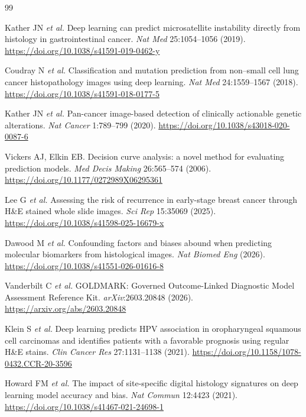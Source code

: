 \documentclass[a4paper,10pt,twocolumn]{extarticle}
\begin{document}
\begingroup
\scriptsize
\begin{thebibliography}{99}
\setlength{\itemsep}{0pt}

Kather JN \textit{et al.} Deep learning can predict microsatellite instability
directly from histology in gastrointestinal cancer.
\textit{Nat Med} 25:1054--1056 (2019).
\url{https://doi.org/10.1038/s41591-019-0462-y}

Coudray N \textit{et al.} Classification and mutation prediction from
non--small cell lung cancer histopathology images using deep learning.
\textit{Nat Med} 24:1559--1567 (2018).
\url{https://doi.org/10.1038/s41591-018-0177-5}

Kather JN \textit{et al.} Pan-cancer image-based detection of clinically
actionable genetic alterations. \textit{Nat Cancer} 1:789--799 (2020).
\url{https://doi.org/10.1038/s43018-020-0087-6}

Vickers AJ, Elkin EB. Decision curve analysis: a novel method for evaluating
prediction models. \textit{Med Decis Making} 26:565--574 (2006).
\url{https://doi.org/10.1177/0272989X06295361}

Lee G \textit{et al.} Assessing the risk of recurrence in early-stage breast
cancer through H\&E stained whole slide images. \textit{Sci Rep} 15:35069
(2025). \url{https://doi.org/10.1038/s41598-025-16679-x}

Dawood M \textit{et al.} Confounding factors and
biases abound when predicting molecular biomarkers from histological images.
\textit{Nat Biomed Eng} (2026).
\url{https://doi.org/10.1038/s41551-026-01616-8}

Vanderbilt C \textit{et al.} GOLDMARK: Governed Outcome-Linked Diagnostic Model
Assessment Reference Kit. \textit{arXiv}:2603.20848 (2026).
\url{https://arxiv.org/abs/2603.20848}

Klein S \textit{et al.} Deep learning predicts HPV association in oropharyngeal
squamous cell carcinomas and identifies patients with a favorable prognosis
using regular H\&E stains. \textit{Clin Cancer Res} 27:1131--1138 (2021).
\url{https://doi.org/10.1158/1078-0432.CCR-20-3596}

Howard FM \textit{et al.} The impact of site-specific digital histology
signatures on deep learning model accuracy and bias.
\textit{Nat Commun} 12:4423 (2021).
\url{https://doi.org/10.1038/s41467-021-24698-1}


\end{thebibliography}
\end{document}
